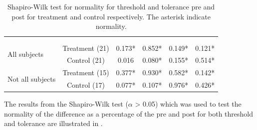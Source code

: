 \begin{longtable} {l|c|c|c|c|c}
\caption{Shapiro-Wilk test for normality for threshold and tolerance pre and post for treatment and control respectively. The asterisk indicate normality.}
	\label{tab:ShapiroWilk1} \\
\cellcolor[HTML]{C0C0C0} {} &  \cellcolor[HTML]{C0C0C0} {} &
\multicolumn{2}{c|}{ \cellcolor[HTML]{C0C0C0}{\textbf{Threshold}}} & \multicolumn{2}{c}{ \cellcolor[HTML]{C0C0C0}{\textbf{Tolerance}}}  	\\  \rule{0pt}{3ex} 
  \cellcolor[HTML]{C0C0C0}{} &   \cellcolor[HTML]{C0C0C0}{} &
 \multicolumn{1}{c|}{ \cellcolor[HTML]{C0C0C0}{Pre }} & \multicolumn{1}{c|}{ \cellcolor[HTML]{C0C0C0}{Post}} 
 & \multicolumn{1}{|c|}{ \cellcolor[HTML]{C0C0C0}{Pre}} 
 & \multicolumn{1}{c}{ \cellcolor[HTML]{C0C0C0}{Post}} 	\\ \hline 
\multirow{ 2}{*}{All subjects} & Treatment (21)& 0.173* & 0.852* & 0.149* & 0.121* \\ \cline{2-6}
 & Control (21)& 0.016  & 0.080* & 0.155*  & 0.514* \\ \hline
\multirow{ 2}{*}{Not all subjects} & Treatment (15) & 0.377*  & 0.930* & 0.582* & 0.142* \\ \cline{2-6}
& Control (17)& 0.077* & 0.107* & 0.976* & 0.426* \\ \hline
\end{longtable}
\vspace{-.5cm}

The results from the Shapiro-Wilk test ($\alpha$ > 0.05) which was used to test the normality of the difference as a percentage of the pre and post for both threshold and tolerance are illustrated in .

